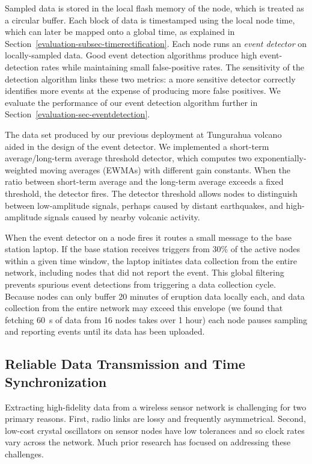 Sampled data is stored in the local flash memory of the node, which is
treated as a circular buffer. Each block of data is timestamped using the
local node time, which can later be mapped onto a global time, as explained
in Section~\ref{evaluation-subsec-timerectification}. Each node runs an
\textit{event detector} on locally-sampled data. Good event detection
algorithms produce high event-detection rates while maintaining small
false-positive rates. The sensitivity of the detection algorithm links these
two metrics: a more sensitive detector correctly identifies more events at
the expense of producing more false positives. We evaluate the performance of
our event detection algorithm further in
Section~\ref{evaluation-sec-eventdetection}.

The data set produced by our previous deployment at Tungurahua
volcano~\cite{volcano-ewsn05} aided in the design of the event detector. We
implemented a short-term average/long-term average threshold detector, which
computes two exponentially-weighted moving averages (EWMAs) with different
gain constants. When the ratio between short-term average and the long-term
average exceeds a fixed threshold, the detector fires. The detector threshold
allows nodes to distinguish between low-amplitude signals, perhaps caused by
distant earthquakes, and high-amplitude signals caused by nearby volcanic
activity.

When the event detector on a node fires it routes a small message to the base
station laptop. If the base station receives triggers from 30\% of the active
nodes within a given time window, the laptop initiates data collection from
the entire network, including nodes that did not report the event. This
global filtering prevents spurious event detections from triggering a data
collection cycle. Because nodes can only buffer 20 minutes of eruption data
locally each, and data collection from the entire network may exceed this
envelope (we found that fetching 60~s of data from 16 nodes takes over 1
hour) each node pauses sampling and reporting events until its data has been
uploaded.

\subsection{Reliable Data Transmission and Time Synchronization}

Extracting high-fidelity data from a wireless sensor network is challenging
for two primary reasons. First, radio links are lossy and frequently
asymmetrical. Second, low-cost crystal oscillators on sensor nodes have low
tolerances and so clock rates vary across the network. Much prior research
has focused on addressing these challenges.


